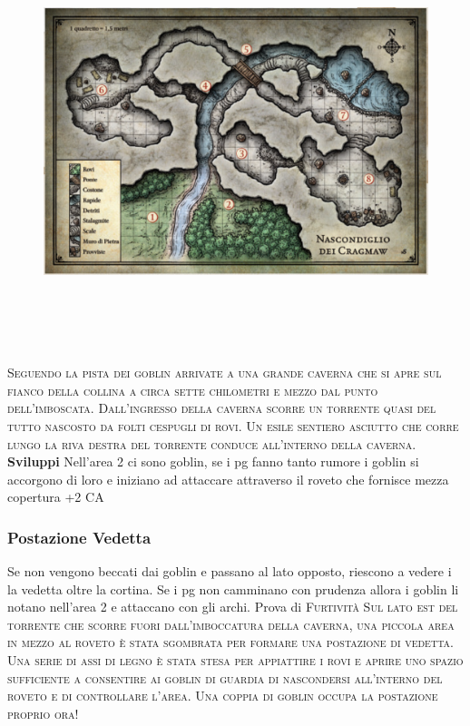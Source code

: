 \documentclass{article}
\begin{document}
    \newpage
    \begin{figure}[t]
        \includegraphics[width=20cm,height=12cm]{../Mappe/NascondiglioDiCagramaw.PNG}
    \end{figure}
        \textsc{Seguendo la pista dei goblin arrivate a una grande caverna che
si apre sul fianco della collina a circa sette chilometri e mezzo
dal punto dell’imboscata. Dall’ingresso della caverna scorre
un torrente quasi del tutto nascosto da folti cespugli di rovi.
Un esile sentiero asciutto che corre lungo la riva destra del
torrente conduce all’interno della caverna.}
\newline
\textbf{Sviluppi}
\newline
Nell'area 2 ci sono goblin, se i pg fanno tanto rumore i goblin si accorgono di loro e iniziano ad attaccare attraverso il roveto che fornisce mezza copertura +2 CA 
\subsubsection{Postazione Vedetta}
Se non vengono beccati dai goblin e passano al lato opposto, riescono a vedere i la vedetta oltre la cortina. Se i pg non camminano con prudenza allora i goblin li notano nell'area 2 e attaccano con gli archi. Prova di \textsc{Furtività} \newline \textsc{Sul lato est del torrente che scorre fuori dall’imboccatura della
caverna, una piccola area in mezzo al roveto è stata sgombrata
per formare una postazione di vedetta. Una serie di assi di
legno è stata stesa per appiattire i rovi e aprire uno spazio
sufficiente a consentire ai goblin di guardia di nascondersi
all’interno del roveto e di controllare l’area. Una coppia di
goblin occupa la postazione proprio ora!}
\end{document}
